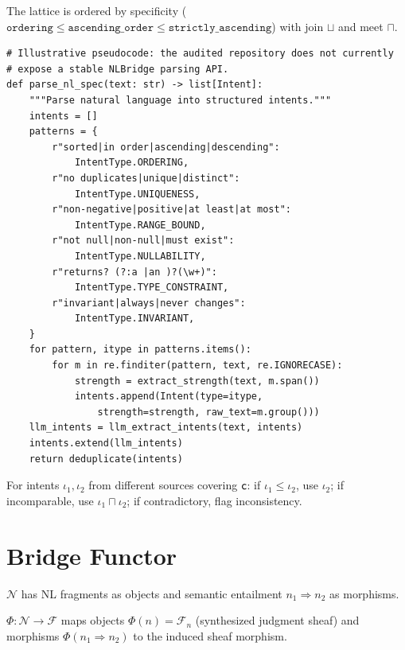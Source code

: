 \documentclass[11pt]{article}
\newcommand{\NLSpec}{\mathcal{N}}
\newcommand{\FormalSpec}{\mathcal{F}}
\newcommand{\SpecFunctor}{\Phi}
\begin{document}
The lattice is ordered by specificity (\eg $\texttt{ordering} \leq
\texttt{ascending\_order} \leq \texttt{strictly\_ascending}$) with
join $\sqcup$ and meet $\sqcap$.

\begin{lstlisting}[style=jugeo-python]
# Illustrative pseudocode: the audited repository does not currently
# expose a stable NLBridge parsing API.
def parse_nl_spec(text: str) -> list[Intent]:
    """Parse natural language into structured intents."""
    intents = []
    patterns = {
        r"sorted|in order|ascending|descending":
            IntentType.ORDERING,
        r"no duplicates|unique|distinct":
            IntentType.UNIQUENESS,
        r"non-negative|positive|at least|at most":
            IntentType.RANGE_BOUND,
        r"not null|non-null|must exist":
            IntentType.NULLABILITY,
        r"returns? (?:a |an )?(\w+)":
            IntentType.TYPE_CONSTRAINT,
        r"invariant|always|never changes":
            IntentType.INVARIANT,
    }
    for pattern, itype in patterns.items():
        for m in re.finditer(pattern, text, re.IGNORECASE):
            strength = extract_strength(text, m.span())
            intents.append(Intent(type=itype,
                strength=strength, raw_text=m.group()))
    llm_intents = llm_extract_intents(text, intents)
    intents.extend(llm_intents)
    return deduplicate(intents)
\end{lstlisting}

\begin{proposition}\label{prop:intent-compose}
For intents $\iota_1, \iota_2$ from different sources covering
$\mathsf{c}$: if $\iota_1 \leq \iota_2$, use $\iota_2$; if incomparable,
use $\iota_1 \sqcap \iota_2$; if contradictory, flag inconsistency.
\end{proposition}

\section{Bridge Functor}\label{sec:bridge-functor}

\begin{definition}\label{def:nl-cat}
$\NLSpec$ has NL fragments as objects and semantic entailment
$n_1 \Rightarrow n_2$ as morphisms.
\end{definition}

\begin{definition}\label{def:bridge}
$\SpecFunctor : \NLSpec \to \FormalSpec$ maps objects
$\SpecFunctor(n) = \mathcal{F}_n$ (synthesized judgment sheaf) and
morphisms $\SpecFunctor(n_1 \Rightarrow n_2)$ to the induced sheaf
morphism.
\end{definition}
\end{document}
